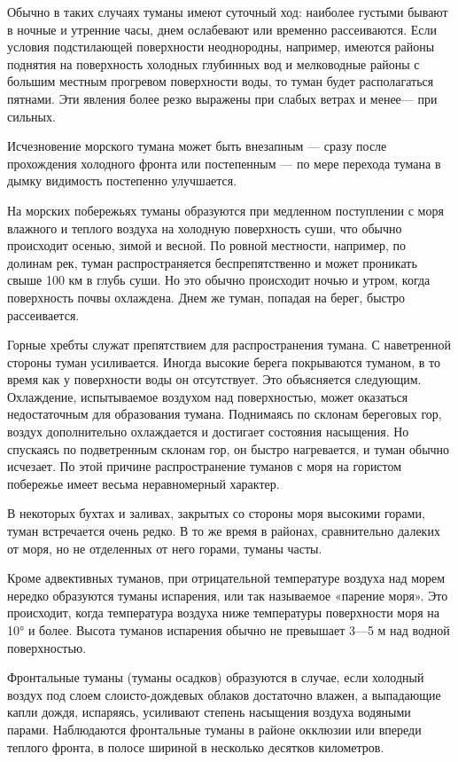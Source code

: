 Обычно в таких случаях туманы имеют суточный ход: наиболее густыми бывают в ночные и утренние часы, днем ослабевают или временно рассеиваются. Если условия подстилающей поверхности неоднородны, например, имеются районы поднятия на поверхность холодных глубинных вод и мелководные районы с большим местным прогревом поверхности воды, то туман будет располагаться пятнами. Эти явления более резко выражены при слабых ветрах и менее— при сильных.

Исчезновение морского тумана может быть внезапным — сразу после прохождения холодного фронта или постепенным — по мере перехода тумана в дымку видимость постепенно улучшается.

На морских побережьях туманы образуются при медленном поступлении с моря влажного и теплого воздуха на холодную поверхность суши, что обычно происходит осенью, зимой и весной. По ровной местности, например, по долинам рек, туман распространяется беспрепятственно и может проникать свыше 100 км в глубь суши. Но это обычно происходит ночью и утром, когда поверхность почвы охлаждена. Днем же туман, попадая на берег, быстро рассеивается.

Горные хребты служат препятствием для распространения тумана. С наветренной стороны туман усиливается. Иногда высокие берега покрываются туманом, в то время как у поверхности воды он отсутствует. Это объясняется следующим. Охлаждение, испытываемое воздухом над поверхностью, может оказаться недостаточным для образования тумана. Поднимаясь по склонам береговых гор, воздух дополнительно охлаждается и достигает состояния насыщения. Но спускаясь по подветренным склонам гор, он быстро нагревается, и туман обычно исчезает. По этой причине распространение туманов с моря на гористом побережье имеет весьма неравномерный характер.

В некоторых бухтах и заливах, закрытых со стороны моря высокими горами, туман встречается очень редко. В то же время в районах, сравнительно далеких от моря, но не отделенных от него горами, туманы часты.

Кроме адвективных туманов, при отрицательной температуре воздуха над морем нередко образуются туманы испарения, или так называемое «парение моря». Это происходит, когда температура воздуха ниже температуры поверхности моря на 10° и более. Высота туманов испарения обычно не превышает 3—5 м над водной поверхностью.

Фронтальные туманы (туманы осадков) образуются в случае, если холодный воздух под слоем слоисто-дождевых облаков достаточно влажен, а выпадающие капли дождя, испаряясь, усиливают степень насыщения воздуха водяными парами. Наблюдаются фронтальные туманы в районе окклюзии или впереди теплого фронта, в полосе шириной в несколько десятков километров.

